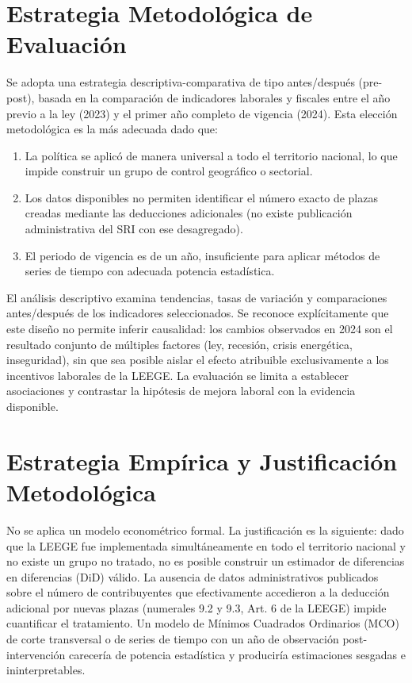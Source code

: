 \documentclass[12pt,spanish]{article}
\providecommand{\tightlist}{%
  \setlength{\itemsep}{0pt}\setlength{\parskip}{0pt}}
\begin{document}
\section{Estrategia Metodológica de
Evaluación}\label{estrategia-metodoluxf3gica-de-evaluaciuxf3n}

Se adopta una estrategia descriptiva-comparativa de tipo antes/después
(pre-post), basada en la comparación de indicadores laborales y fiscales
entre el año previo a la ley (2023) y el primer año completo de vigencia
(2024). Esta elección metodológica es la más adecuada dado que:

\begin{enumerate}
\def\labelenumi{\alph{enumi})}
\tightlist
\item
  La política se aplicó de manera universal a todo el territorio
  nacional, lo que impide construir un grupo de control geográfico o
  sectorial.
\item
  Los datos disponibles no permiten identificar el número exacto de
  plazas creadas mediante las deducciones adicionales (no existe
  publicación administrativa del SRI con ese desagregado).
\item
  El periodo de vigencia es de un año, insuficiente para aplicar métodos
  de series de tiempo con adecuada potencia estadística.
\end{enumerate}

El análisis descriptivo examina tendencias, tasas de variación y
comparaciones antes/después de los indicadores seleccionados. Se
reconoce explícitamente que este diseño no permite inferir causalidad:
los cambios observados en 2024 son el resultado conjunto de múltiples
factores (ley, recesión, crisis energética, inseguridad), sin que sea
posible aislar el efecto atribuible exclusivamente a los incentivos
laborales de la LEEGE. La evaluación se limita a establecer asociaciones
y contrastar la hipótesis de mejora laboral con la evidencia disponible.

\section{Estrategia Empírica y Justificación
Metodológica}\label{estrategia-empuxedrica-y-justificaciuxf3n-metodoluxf3gica}

No se aplica un modelo econométrico formal. La justificación es la
siguiente: dado que la LEEGE fue implementada simultáneamente en todo el
territorio nacional y no existe un grupo no tratado, no es posible
construir un estimador de diferencias en diferencias (DiD) válido. La
ausencia de datos administrativos publicados sobre el número de
contribuyentes que efectivamente accedieron a la deducción adicional por
nuevas plazas (numerales 9.2 y 9.3, Art. 6 de la LEEGE) impide
cuantificar el tratamiento. Un modelo de Mínimos Cuadrados Ordinarios
(MCO) de corte transversal o de series de tiempo con un año de
observación post-intervención carecería de potencia estadística y
produciría estimaciones sesgadas e ininterpretables.
\end{document}

